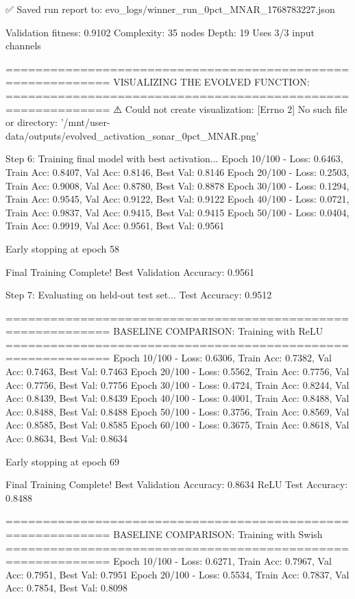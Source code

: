 ✅ Saved run report to: evo_logs/winner_run_0pct_MNAR_1768783227.json

Validation fitness: 0.9102
Complexity: 35 nodes
Depth: 19
Uses 3/3 input channels

============================================================
VISUALIZING THE EVOLVED FUNCTION:
============================================================
⚠️ Could not create visualization: [Errno 2] No such file or directory: '/mnt/user-data/outputs/evolved_activation_sonar_0pct_MNAR.png'

Step 6: Training final model with best activation...
Epoch  10/100 - Loss: 0.6463, Train Acc: 0.8407, Val Acc: 0.8146, Best Val: 0.8146
Epoch  20/100 - Loss: 0.2503, Train Acc: 0.9008, Val Acc: 0.8780, Best Val: 0.8878
Epoch  30/100 - Loss: 0.1294, Train Acc: 0.9545, Val Acc: 0.9122, Best Val: 0.9122
Epoch  40/100 - Loss: 0.0721, Train Acc: 0.9837, Val Acc: 0.9415, Best Val: 0.9415
Epoch  50/100 - Loss: 0.0404, Train Acc: 0.9919, Val Acc: 0.9561, Best Val: 0.9561

Early stopping at epoch 58

Final Training Complete!
Best Validation Accuracy: 0.9561

Step 7: Evaluating on held-out test set...
Test Accuracy: 0.9512

============================================================
BASELINE COMPARISON: Training with ReLU
============================================================
Epoch  10/100 - Loss: 0.6306, Train Acc: 0.7382, Val Acc: 0.7463, Best Val: 0.7463
Epoch  20/100 - Loss: 0.5562, Train Acc: 0.7756, Val Acc: 0.7756, Best Val: 0.7756
Epoch  30/100 - Loss: 0.4724, Train Acc: 0.8244, Val Acc: 0.8439, Best Val: 0.8439
Epoch  40/100 - Loss: 0.4001, Train Acc: 0.8488, Val Acc: 0.8488, Best Val: 0.8488
Epoch  50/100 - Loss: 0.3756, Train Acc: 0.8569, Val Acc: 0.8585, Best Val: 0.8585
Epoch  60/100 - Loss: 0.3675, Train Acc: 0.8618, Val Acc: 0.8634, Best Val: 0.8634

Early stopping at epoch 69

Final Training Complete!
Best Validation Accuracy: 0.8634
ReLU Test Accuracy: 0.8488

============================================================
BASELINE COMPARISON: Training with Swish
============================================================
Epoch  10/100 - Loss: 0.6271, Train Acc: 0.7967, Val Acc: 0.7951, Best Val: 0.7951
Epoch  20/100 - Loss: 0.5534, Train Acc: 0.7837, Val Acc: 0.7854, Best Val: 0.8098

